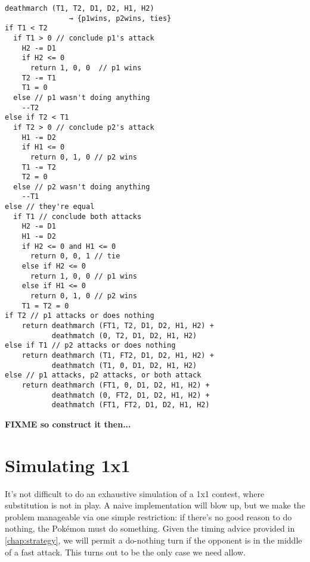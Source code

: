 \begin{lstlisting}[caption={Death march simulation pseudocode},label={list:deathmarch}]
deathmarch (T1, T2, D1, D2, H1, H2)
               → {p1wins, p2wins, ties}
if T1 < T2
  if T1 > 0 // conclude p1's attack
    H2 -= D1
    if H2 <= 0
      return 1, 0, 0  // p1 wins
    T2 -= T1
    T1 = 0
  else // p1 wasn't doing anything
    --T2
else if T2 < T1
  if T2 > 0 // conclude p2's attack
    H1 -= D2
    if H1 <= 0
      return 0, 1, 0 // p2 wins
    T1 -= T2
    T2 = 0
  else // p2 wasn't doing anything
    --T1
else // they're equal
  if T1 // conclude both attacks
    H2 -= D1
    H1 -= D2
    if H2 <= 0 and H1 <= 0
      return 0, 0, 1 // tie
    else if H2 <= 0
      return 1, 0, 0 // p1 wins
    else if H1 <= 0
      return 0, 1, 0 // p2 wins
    T1 = T2 = 0
if T2 // p1 attacks or does nothing
    return deathmarch (FT1, T2, D1, D2, H1, H2) +
           deathmatch (0, T2, D1, D2, H1, H2)
else if T1 // p2 attacks or does nothing
    return deathmarch (T1, FT2, D1, D2, H1, H2) +
           deathmatch (T1, 0, D1, D2, H1, H2)
else // p1 attacks, p2 attacks, or both attack
    return deathmarch (FT1, 0, D1, D2, H1, H2) +
           deathmatch (0, FT2, D1, D2, H1, H2) +
           deathmatch (FT1, FT2, D1, D2, H1, H2)
\end{lstlisting}

\textbf{FIXME so construct it then...}

\section{Simulating 1x1}
\label{sec:simul1x1}
It's not difficult to do an exhaustive simulation of a 1x1 contest,
 where substitution is not in play.
A naive implementation will blow up, but we make the problem manageable
 via one simple restriction: if there's no good reason to do nothing,
 the Pokémon must do something.
Given the timing advice provided in \autoref{chap:strategy}, we will permit
 a do-nothing turn if the opponent is in the middle of a fast attack.
This turns out to be the only case we need allow.

